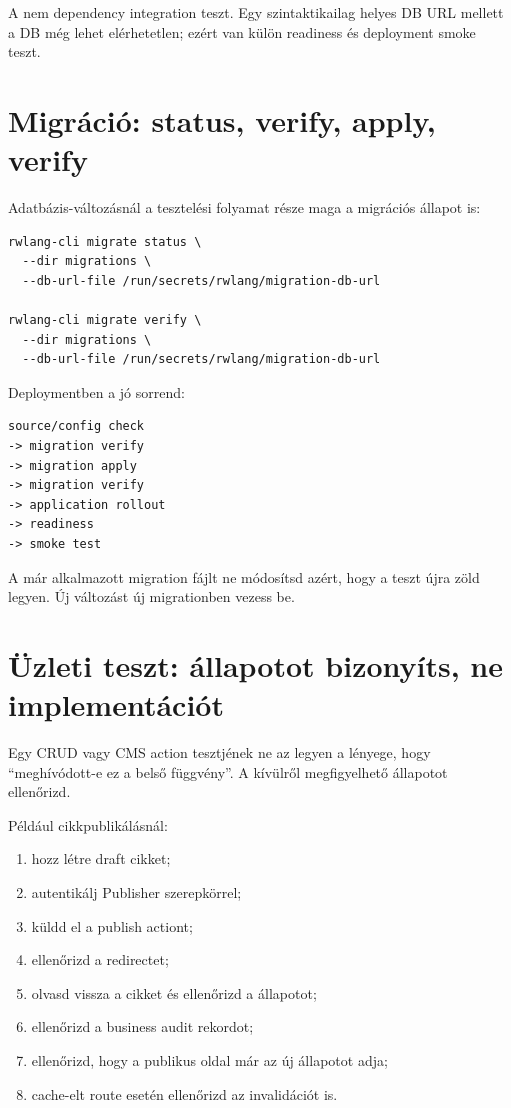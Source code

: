 A  nem dependency integration teszt. Egy szintaktikailag helyes DB URL mellett a DB még lehet elérhetetlen; ezért van külön readiness és deployment smoke teszt.

\section{Migráció: status, verify, apply, verify}

Adatbázis-változásnál a tesztelési folyamat része maga a migrációs állapot is:

\begin{lstlisting}
rwlang-cli migrate status \
  --dir migrations \
  --db-url-file /run/secrets/rwlang/migration-db-url

rwlang-cli migrate verify \
  --dir migrations \
  --db-url-file /run/secrets/rwlang/migration-db-url
\end{lstlisting}

Deploymentben a jó sorrend:

\begin{lstlisting}
source/config check
-> migration verify
-> migration apply
-> migration verify
-> application rollout
-> readiness
-> smoke test
\end{lstlisting}

A már alkalmazott migration fájlt ne módosítsd azért, hogy a teszt újra zöld legyen. Új változást új migrationben vezess be.

\section{Üzleti teszt: állapotot bizonyíts, ne implementációt}

Egy CRUD vagy CMS action tesztjének ne az legyen a lényege, hogy ``meghívódott-e ez a belső függvény''. A kívülről megfigyelhető állapotot ellenőrizd.

Például cikkpublikálásnál:

\begin{enumerate}
  \item hozz létre draft cikket;
  \item autentikálj Publisher szerepkörrel;
  \item küldd el a publish actiont;
  \item ellenőrizd a redirectet;
  \item olvasd vissza a cikket és ellenőrizd a  állapotot;
  \item ellenőrizd a business audit rekordot;
  \item ellenőrizd, hogy a publikus oldal már az új állapotot adja;
  \item cache-elt route esetén ellenőrizd az invalidációt is.
\end{enumerate}

